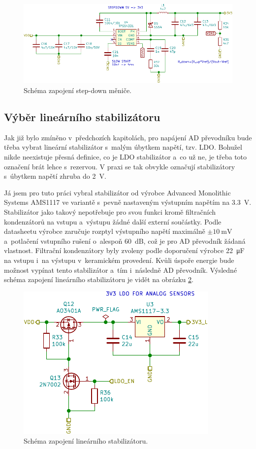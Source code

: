 \begin{figure}[h]
    \centering
    \includegraphics{obrazky/stepdown_schematic.pdf}
    \caption{Schéma zapojení step-down měniče.}
    \label{fig_StepDown-schematic}
\end{figure}

\subsection{Výběr lineárního stabilizátoru}

Jak již bylo zmíněno v~předchozích kapitolách, pro napájení AD převodníku bude třeba vybrat lineární stabilizátor s~malým úbytkem napětí, tzv. LDO. Bohužel nikde neexistuje přesná definice, co je LDO stabilizátor a~co už ne, je třeba toto označení brát lehce s~rezervou. V praxi se tak obvykle označují stabilizátory s~úbytkem napětí zhruba do \SI{2}{\volt}.

Já jsem pro tuto práci vybral stabilizátor od výrobce Advanced Monolithic Systems AMS1117 \cite{dat_AMS1117} ve variantě s~pevně nastaveným výstupním napětím na \SI{3,3}{\volt}. Stabilizátor jako takový nepotřebuje pro svou funkci kromě filtračních kondenzátorů na vstupu a~výstupu žádné další externí součástky. Podle datasheetu výrobce zaručuje rozptyl výstupního napětí maximálně $\pm\SI{10}{\milli\volt}$ a~potlačení vstupního rušení o~alespoň \SI{60}{\deci\bel}, což je pro AD převodník žádaná vlastnost. Filtrační kondenzátory byly zvoleny podle doporučení výrobce \SI{22}{\micro\farad} na vstupu i~na výstupu v~keramickém provedení. Kvůli úspoře energie bude možnost vypínat tento stabilizátor a~tím i~následně AD převodník. Výsledné schéma zapojení lineárního stabilizátoru je vidět na obrázku \ref{fig_LDO-schematic}.

\begin{figure}[h]
    \centering
    \includegraphics{obrazky/ldo-schematic.pdf}
    \caption{Schéma zapojení lineárního stabilizátoru.}
    \label{fig_LDO-schematic}
\end{figure}

